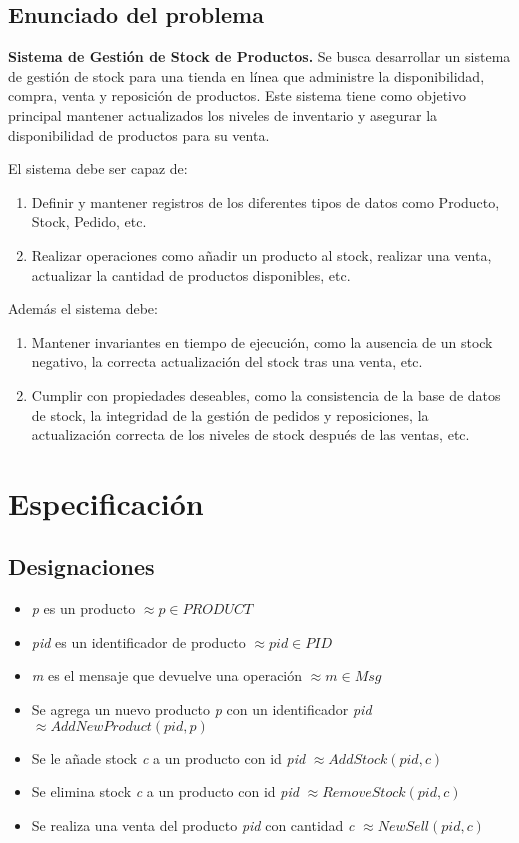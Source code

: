 \documentclass[fleqn,colorlinks,linkcolor=blue,citecolor=blue,urlcolor=blue]{article}
\newcommand{\desig}[2]{\item #1 $\approx #2$}
\begin{document}
\subsection{Enunciado del problema}

\noindent 
\textbf{Sistema de Gestión de Stock de Productos.} Se busca desarrollar un sistema de gestión de stock para una tienda en línea que administre la disponibilidad, compra, venta y reposición de productos. Este sistema tiene como objetivo principal mantener actualizados los niveles de inventario y asegurar la disponibilidad de productos para su venta.

\vspace{0.2cm}

\noindent
El sistema debe ser capaz de:

\begin{enumerate}
    \item Definir y mantener registros de los diferentes tipos de datos como Producto, Stock, Pedido, etc.

    \item Realizar operaciones como añadir un producto al stock, realizar una venta, actualizar la cantidad de productos disponibles, etc.
\end{enumerate}

\noindent
Además el sistema debe:

\begin{enumerate}
    \item Mantener invariantes en tiempo de ejecución, como la ausencia de un stock negativo, la correcta actualización del stock tras una venta, etc.

    \item Cumplir con propiedades deseables, como la consistencia de la base de datos de stock, la integridad de la gestión de pedidos y reposiciones, la actualización correcta de los niveles de stock después de las ventas, etc.
\end{enumerate}

\section{Especificación}

\subsection{Designaciones}

\begin{itemize}
    \desig{\textit{p} es un producto}{p \in PRODUCT}
    \desig{\textit{pid} es un identificador de producto}{pid \in PID}
    \desig{\textit{m} es el mensaje que devuelve una operación}{m \in Msg}
    \desig{Se agrega un nuevo producto \textit{p} con un identificador \textit{pid}}{ AddNewProduct(pid, p)}
    \desig{Se le añade stock \textit{c} a un producto con id \textit{pid}}{AddStock(pid, c)}
    \desig{Se elimina stock \textit{c} a un producto con id \textit{pid}}{RemoveStock(pid, c)}
    \desig{Se realiza una venta del producto \textit{pid} con cantidad \textit{c}} {NewSell(pid, c)}
\end{itemize}
\end{document}
